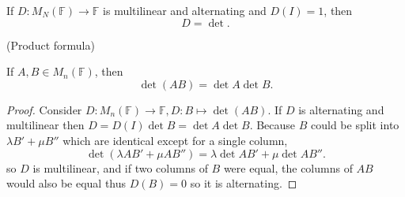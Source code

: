 \begin{corollary}
    If $D : M_N(\mathbb{F}) \rightarrow \mathbb{F}$ is multilinear and alternating and $D(I) = 1$, then
    \[D = \det.\]
\end{corollary}

\begin{theorem} (Product formula)

  If $A, B \in M_n(\mathbb{F})$, then
  \[\det(AB) = \det A \det B.\]
    
\end{theorem}
\begin{proof}
    Consider $D : M_n(\mathbb{F}) \rightarrow \mathbb{F}, D: B \mapsto \det(AB)$. If $D$ is alternating and multilinear then $D = D(I) \det B = \det A \det B$. Because $B$ could be split into $\lambda B' + \mu B''$ which are identical except for a single column, 
    \[\det(\lambda AB' + \mu AB'') = \lambda \det AB' + \mu \det AB''.\]
    so $D$ is multilinear, and if two columns of $B$ were equal, the columns of $AB$ would also be equal thus $D(B) = 0$ so it is alternating.
\end{proof}
